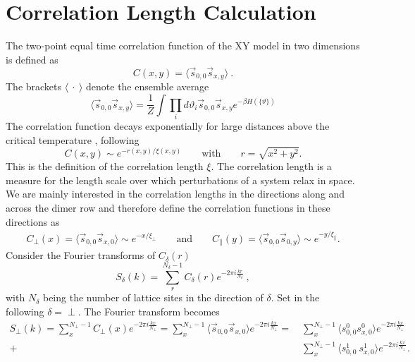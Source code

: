 	\section{Correlation Length Calculation} \label{Section::Corr-Length-Calculation}
	The two-point equal time correlation function of the XY model in two dimensions is defined as
	\begin{equation}
		C(x, y) = \langle \vec{s}_{0,0} \vec{s}_{x, y} \rangle ~.
	\end{equation}
	The brackets $\langle~\cdot~\rangle$ denote the ensemble average
	\begin{equation}
		\langle \vec{s}_{0,0} \vec{s}_{x, y} \rangle  = \frac{1}{Z} \int \prod_i d\vartheta_i \vec{s}_{0,0} \vec{s}_{x, y} e^{- \beta H(\{\vartheta\})}
	\end{equation}	
	The correlation function decays exponentially for large distances above the critical temperature \cite{kosterlitz1974critical, amit1980renormalisation}, following	 
	\begin{equation} \label{Eq::corr-func-decay-above-Tc}
		C(x, y) \sim e^{-r(x,y) /	\xi(x,y)} \qquad \text{with} \qquad r =	\sqrt{x^2 + y^2}.
	\end{equation}
	This is the definition of the correlation length $\xi$. The correlation length is a measure for the length scale over which perturbations of a system relax in space. We are mainly interested in the correlation lengths in the directions along and across the dimer row and therefore define the correlation functions in these directions as
	\begin{align} \label{Eq::Corr-Func-asymptotic}
		C_\perp(x) =  \langle \vec{s}_{0,0} \vec{s}_{x, 0} \rangle \sim e^{-x /	\xi_\perp} \qquad \text{and} \qquad
		C_\parallel(y) =  \langle \vec{s}_{0,0} \vec{s}_{0, y} \rangle \sim e^{-y /	\xi_\parallel}.
	\end{align}
	Consider the Fourier transforms of $C_\delta(r)$
	\begin{equation}  \label{Eq::FT-Corr-delta}
		S_\delta(k) = \sum_r^{N_\delta - 1} C_\delta (r) e^{-2\pi i \frac{kr}{N_\delta}}~,
	\end{equation}
	with $N_\delta$ being the number of lattice sites in the direction of $\delta$. Set in the following $\delta =	\perp$. The Fourier transform becomes 
	\begin{equation} \label{Eq::FT-of-Corr-perp}
		\begin{split}
			S_\perp(k) = \sum_x^{N_\perp - 1} C_\perp (x) e^{-2\pi i \frac{kx}{N_\perp}} =\sum_x^{N_\perp - 1} \langle \vec{s}_{0,0} \vec{s}_{x, 0} \rangle e^{-2\pi i \frac{kx}{N_\perp}} = ~&\sum_x^{N_\perp - 1} \langle s^0_{0,0} s_{x, 0}^0 \rangle e^{-2\pi i \frac{kx}{N_\perp}} \\
			+&\sum_x^{N_\perp - 1} \langle s_{0,0}^1  \
			s_{x, 0}^1 \rangle e^{-2\pi i \frac{kx}{N_\perp}}.
		\end{split}
	\end{equation}
